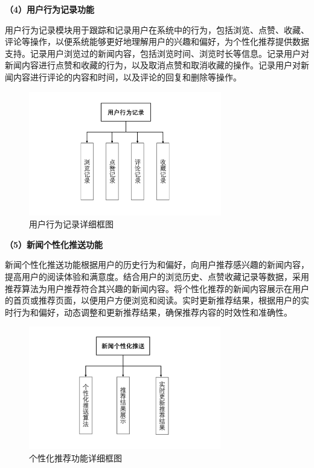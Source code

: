 \documentclass[withoutpreface,bwprint]{cumcmthesis} %
\begin{document}
	\textbf{（4）用户行为记录功能}\par
	用户行为记录模块用于跟踪和记录用户在系统中的行为，包括浏览、点赞、收藏、评论等操作，以便系统能够更好地理解用户的兴趣和偏好，为个性化推荐提供数据支持。记录用户浏览过的新闻内容，包括浏览时间、浏览时长等信息。记录用户对新闻内容进行点赞和收藏的行为，以及取消点赞和取消收藏的操作。记录用户对新闻内容进行评论的内容和时间，以及评论的回复和删除等操作。\par
	\begin{figure}[H]
		\centering
		\includegraphics[width=0.75\textwidth]{用户行为记录详细框图}
		\caption{用户行为记录详细框图}
		\label{fig:circuit-diagcam}
	\end{figure}
	\textbf{（5）新闻个性化推送功能}\par
	新闻个性化推送功能根据用户的历史行为和偏好，向用户推荐感兴趣的新闻内容，提高用户的阅读体验和满意度。结合用户的浏览历史、点赞收藏记录等数据，采用推荐算法为用户推荐符合其兴趣的新闻内容。将个性化推荐的新闻内容展示在用户的首页或推荐页面，以便用户方便浏览和阅读。实时更新推荐结果，根据用户的实时行为和偏好，动态调整和更新推荐结果，确保推荐内容的时效性和准确性。\par
	\begin{figure}[H]
		\centering
		\includegraphics[width=0.75\textwidth]{个性化推荐功能详细框图}
		\caption{个性化推荐功能详细框图}
		\label{fig:circuit-diagcam}
	\end{figure}
\end{document}
